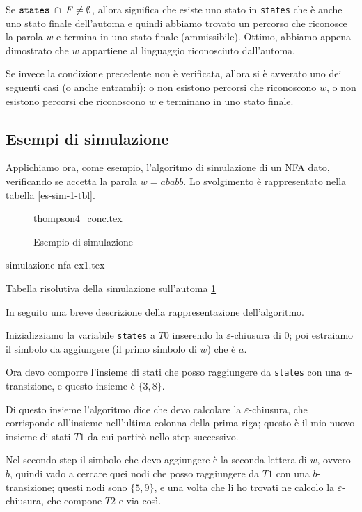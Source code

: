 \documentclass[class=book, crop=false, oneside, 12pt]{standalone}
\begin{document}
Se \(\textrm{\texttt{states}} \; \cap \; F \neq \emptyset\), allora significa che esiste uno stato in \texttt{states} che è anche uno stato finale dell'automa e quindi abbiamo trovato un percorso che riconosce la parola \(w\) e termina in uno stato finale (ammissibile). Ottimo, abbiamo appena dimostrato che \(w\) appartiene al linguaggio riconosciuto dall'automa.

Se invece la condizione precedente non è verificata, allora si è avverato uno dei seguenti casi (o anche entrambi): o non esistono percorsi che riconoscono \(w\), o non esistono percorsi che riconoscono \(w\) e terminano in uno stato finale.

\subsection{Esempi di simulazione}
Applichiamo ora, come esempio, l'algoritmo di simulazione di un NFA dato, verificando se accetta la parola \(w  = ababb\). Lo svolgimento è rappresentato nella tabella \ref{es-sim-1-tbl}.

\begin{figure}
    \centering
    {thompson4_conc.tex}
    \caption{Esempio di simulazione}
    \label{es-sim-1}
\end{figure}

\begin{table}[H]
	\centering
	{simulazione-nfa-ex1.tex}
    \caption{Tabella risolutiva della simulazione sull'automa \ref{es-sim-1}}
    \label{es-sim-1-tbl}
\end{table} 

\noindent In seguito una breve descrizione della rappresentazione dell'algoritmo.

Inizializziamo la variabile \texttt{states} a \(T0\) inserendo la \(\varepsilon\)-chiusura di \(0\); poi estraiamo il simbolo da aggiungere (il primo simbolo di \(w\)) che è \(a\).

Ora devo comporre l’insieme di stati che posso raggiungere da \texttt{states} con una \(a\)-transizione, e questo insieme è \(\{3, 8\}\). 

Di questo insieme l’algoritmo dice che devo calcolare la \(\varepsilon\)-chiusura, che corrisponde all’insieme nell’ultima colonna della prima riga; questo è il mio nuovo insieme di stati \(T1\) da cui partirò nello step successivo.

Nel secondo step il simbolo che devo aggiungere è la seconda lettera di \(w\), ovvero \(b\), quindi vado a cercare quei nodi che posso raggiungere da \(T1\) con una \(b\)-transizione; questi nodi sono \(\{5,9\}\), e una volta che li ho trovati ne calcolo la \(\varepsilon\)-chiusura, che compone \(T2\) e via così.
\end{document}
